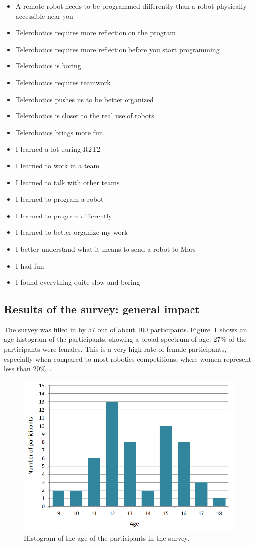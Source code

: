 \documentclass{intech-journal}
\begin{document}
\begin{itemize}[noitemsep,nolistsep]
\item A remote robot needs to be programmed differently than a robot physically accessible near you 	
\item Telerobotics requires more reflection on the program 	
\item Telerobotics requires more reflection before you start programming 	
\item Telerobotics is boring 	
\item Telerobotics requires teamwork 	
\item Telerobotics pushes us to be better organized 	
\item Telerobotics is closer to the real use of robots 	
\item Telerobotics brings more fun
\item I learned a lot during R2T2 	
\item I learned to work in a team 	
\item I learned to talk with other teams 	
\item I learned to program a robot 	
\item I learned to program differently 	
\item I learned to better organize my work 	
\item I better understand what it means to send a robot to Mars 	
\item I had fun 	
\item I found everything quite slow and boring
\end{itemize}

\subsection{Results of the survey: general impact}

The survey was filled in by 57 out of about 100 participants. 
Figure~\ref{fig:age} shows an age histogram of the participants, showing a broad spectrum of age.
27\% of the participants were females.
This is a very high rate of female participants, especially when compared to most robotics competitions, where women represent less than 20\%~\cite{riedo2013upgrade}.

\begin{figure}[ht]
 \centering
    \includegraphics[width=0.5\columnwidth]{figures/Age.png}
  \caption{Histogram of the age of the participants in the survey.}
  \label{fig:age} 
\end{figure}
\end{document}
